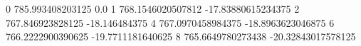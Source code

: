 0 785.993408203125 0.0
1 768.1546020507812 -17.83880615234375
2 767.846923828125 -18.146484375
4 767.0970458984375 -18.8963623046875
6 766.2222900390625 -19.7711181640625
8 765.6649780273438 -20.32843017578125

